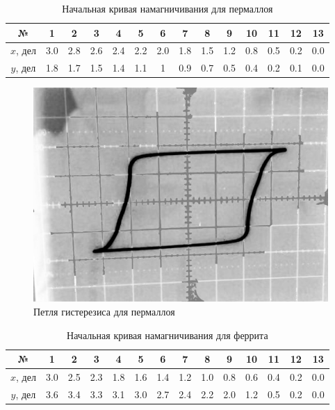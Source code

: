 \documentclass[12pt]{kiarticle}
\begin{document}
\begin{enumerate}
		\begin{table}[h!]
		\caption{Начальная кривая намагничивания для пермаллоя}
		\begin{center}
			\begin{tabular}{|c|c|c|c|c|c|c|c|c|c|c|c|c|c|} 
				\hline 
				№ &  1 &  2 & 3 & 4 & 5 &  6 &  7 & 8 & 9 & 10  &  11 &  12 &13   \\ 	\hline
				
			$ x $, дел & 3.0 & 2.8 & 2.6 & 2.4 & 2.2 & 2.0 & 1.8 & 1.5 & 1.2 & 0.8 & 0.5 & 0.2 & 0.0 \\
			 $ y $, дел & 1.8 & 1.7 & 1.5 & 1.4 & 1.1 & 1 & 0.9 & 0.7 & 0.5 & 0.4 & 0.2 & 0.1 & 0.0 \\
				\hline
				
			\end{tabular}
		\end{center}
	\end{table}


	\begin{figure}[h!]
	\includegraphics[scale=0.2]{2.png}
	\caption{Петля гистерезиса для пермаллоя}
\end{figure}

  		
  		\begin{table}[h!]
  		\caption{Начальная кривая намагничивания для феррита}
  		\begin{center}
  			\begin{tabular}{|c|c|c|c|c|c|c|c|c|c|c|c|c|c|} 
  				\hline 
  				№ &  1 &  2 & 3 & 4 & 5 &  6 &  7 & 8 & 9 & 10  &  11 &  12 &13   \\ 	\hline
  				
  			$ x $, дел &3.0 & 2.5 & 2.3 & 1.8 & 1.6 & 1.4 & 1.2 & 1.0 & 0.8 & 0.6 & 0.4 & 0.2 & 0.0 \\
  			 $ y $, дел & 3.6 & 3.4 & 3.3 & 3.1 & 3.0 & 2.7 & 2.4 & 2.2 & 2.0 & 1.2 & 0.5 & 0.2 & 0.0 \\
  				\hline
  				

\end{tabular}
\end{center}
\end{table}
\end{enumerate}
\end{document}
